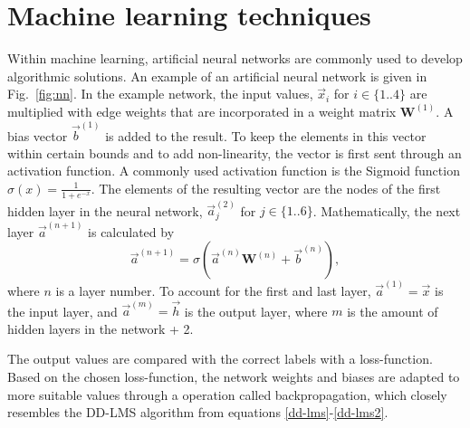 \documentclass[journal,10pt,twoside, a4paper]{IEEEtran}
\begin{document}
\section{Machine learning techniques}


Within machine learning, artificial neural networks are commonly used to develop algorithmic solutions. An example of an artificial neural network is given in Fig.~\ref{fig:nn}. In the example network, the input values, $\vec{x}_i$ for $i\in \{1..4\}$ are multiplied with edge weights that are incorporated in a weight matrix $\mathbf{W}^{(1)}$. A bias vector $\vec{b}^{(1)}$ is added to the result. To keep the elements in this vector within certain bounds and to add non-linearity, the vector is first sent through an activation function. A commonly used activation function is the Sigmoid function $\sigma(x) = \frac{1}{1+e^{-x}}$. The elements of the resulting vector are the nodes of the first hidden layer in the neural network, $\vec{a}_j^{(2)}$ for $j\in \{1..6\}$. Mathematically, the next layer $\vec{a}^{(n+1)}$ is calculated by 
\begin{equation}
    \vec{a}^{(n+1)} = \sigma\left(\vec{a}^{(n)}\mathbf{W}^{(n)}+\vec{b}^{(n)}\right),
\end{equation}
where $n$ is a layer number. To account for the first and last layer, $\vec{a}^{(1)} = \vec{x}$ is the input layer, and $\vec{a}^{(m)} = \vec{h}$ is the output layer, where $m$ is the amount of hidden layers in the network + 2.

The output values are compared with the correct labels with a loss-function. Based on the chosen loss-function, the network weights and biases are adapted to more suitable values through a operation called backpropagation\cite{backpropagation}, which closely resembles the DD-LMS algorithm from equations \ref{dd-lms}-\ref{dd-lms2}.
\end{document}
